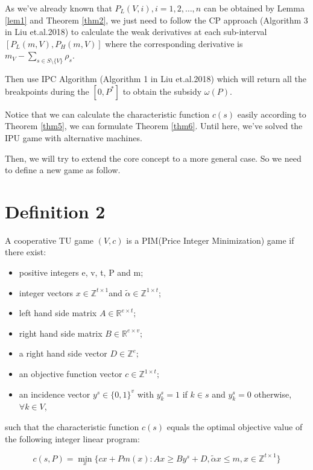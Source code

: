 \documentclass[UTF8]{article}
\begin{document}
As we've already known that $P_L(V,i), i = 1,2,\ldots,n$ can be obtained by Lemma \ref{lem1} and Theorem \ref{thm2}, we just need to follow the CP approach (Algorithm 3 in Liu et.al.2018) to calculate the weak derivatives at each sub-interval $[P_L(m,V),P_H(m,V)]$ where the corresponding derivative is $m_V-\sum_{s\in S\setminus\{V\}} \rho_s$.

Then use IPC Algorithm (Algorithm 1 in Liu et.al.2018) which will return all the breakpoints during the $[0, P^*]$ to obtain the subsidy $\omega(P)$.

Notice that we can calculate the characteristic function $c(s)$ easily according to Theorem \ref{thm5}, we can formulate Theorem \ref{thm6}. Until here, we've solved the IPU game with alternative machines.

Then, we will try to extend the core concept to a more general case. So we need to define a new game as follow.

\section*{Definition 2}

A cooperative TU game $(V,c)$ is a PIM(Price Integer Minimization) game if there exist:

\begin{itemize}
	\item positive integers e, v, t, P and m;
	\item integer vectors $ x \in \mathbb{Z}^{t \times 1} $and $ \tilde{\alpha} \in \mathbb{Z}^{1 \times t} $;
	\item left hand side matrix  $A \in \mathbb{R} ^{e \times t};$
	\item right hand side matrix $B \in \mathbb{R} ^ {e \times v};$
	\item a right hand side vector $D \in \mathbb{Z} ^ {e};$
	\item an objective function vector
	$c \in \mathbb{Z}^{1 \times t};$
	\item an incidence vector $y^s \in \{0,1\}^v$ with $y^s_k = 1$ if $k \in s$ and $y^s_k = 0 $ otherwise, $\forall k \in V$,

\end{itemize}

such that the characteristic function $c(s)$ equals the optimal objective value of the following integer linear program:

\[
c(s,P)= \mathop{\min}_{x} \{ cx+Pm(x): Ax \geq By^s+D, \tilde{\alpha}x \leq m, x \in \mathbb{Z}^{t \times 1} \}
\]
\end{document}

